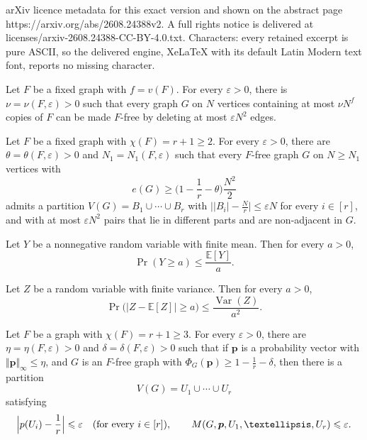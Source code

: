 \documentclass[10pt,a4paper]{amsart}
\newcommand{\EE}{\mathbb{E}}
\newcommand{\Var}{\operatorname{Var}}
\renewcommand{\ge}{\geqslant}
\renewcommand{\le}{\leqslant}
\begin{document}
arXiv licence metadata for this exact version and shown on the abstract page https://arxiv.org/abs/2608.24388v2. A full rights notice is delivered at licenses/arxiv-2608.24388-CC-BY-4.0.txt. Characters: every retained excerpt is pure ASCII, so the delivered engine, XeLaTeX with its default Latin Modern text font, reports no missing character.
\begin{theorem}\label{thm:removal}
Let $F$ be a fixed graph with $f=v(F)$. For every
$\varepsilon >0$, there is $\nu =\nu (F,\varepsilon )>0$
such that every graph $G$ on $N$ vertices containing at most $\nu N^{f}$ copies of $F$ can be made $F$-free by deleting at most $\varepsilon N^{2}$ edges.
\end{theorem} 

\begin{theorem}
\label{thm:stability}
Let $F$ be a fixed graph with $\chi (F)=r+1\ge 2$. For
every $\varepsilon >0$, there are $\theta =\theta
(F,\varepsilon )>0$ and $N_1=N_1(F,\varepsilon )$ such
that every $F$-free graph $G$ on $N\ge N_1$ vertices with 
$$e(G)\ge \Big(1-\frac1r-\theta \Big)\frac{N^{2}}{2}$$ 
admits a partition $V(G)=B_1\cup \cdots \cup B_r$ with
$\bigl\lvert |B_i|-\frac Nr\bigr\rvert \le \varepsilon N$
for every $i\in [r]$, and with at most $\varepsilon N^{2}$
pairs that lie in different parts and are non-adjacent
in $G$.
\end{theorem}

\begin{lemma}
\label{lem:markov}
Let $Y$ be a nonnegative random variable with finite
mean. Then for every $a>0$,
\[
  \Pr (Y\ge a)\le \frac{\EE [Y] }{a}.
\]
\end{lemma}

\begin{lemma}
\label{lem:chebyshev}
Let $Z$ be a random variable with finite variance.
Then for every $a>0$,
\[
  \Pr \bigl( \big\lvert Z-\EE [Z] \big\rvert \ge a\bigr)
  \le \frac{\Var (Z)}{a^2}.
\]
\end{lemma}

\begin{theorem}
\label{thm:weighted-stability}
Let $F$ be a graph with $\chi (F)=r+1\ge 3$. For every
$\varepsilon >0$, there are $\eta =\eta (F,\varepsilon )>0$ and $\delta =\delta(F,\varepsilon)>0$ such that
if $\bm{p}$ is a probability vector with
$\Vert \bm{p} \Vert_\infty\le \eta$, 
and $G$ is an $F$-free graph with $\Phi_G(\bm{p})\ge 1- \frac{1}{r} - \delta$, then there is a
  partition 
  $$V(G)=U_1\cup \cdots \cup U_r$$
   satisfying 
  \[
    \Bigl|p(U_i)-\frac1r\Bigr|\le \varepsilon 
    \quad (\text{for every}~i\in [r]),
    \qquad
    M(G,\bm{p},U_1,\ldots ,U_r)\le \varepsilon .
  \] 
\end{theorem}
\end{document}
